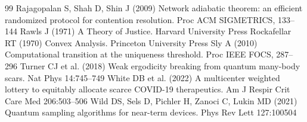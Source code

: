 \documentclass[11pt,a4paper]{article}
\begin{document}
\begin{thebibliography}{99}
 Rajagopalan S, Shah D, Shin J (2009) Network adiabatic theorem: an efficient randomized protocol for contention resolution. Proc ACM SIGMETRICS, 133--144
 Rawls J (1971) A Theory of Justice. Harvard University Press
 Rockafellar RT (1970) Convex Analysis. Princeton University Press
 Sly A (2010) Computational transition at the uniqueness threshold. Proc IEEE FOCS, 287--296
 Turner CJ et al. (2018) Weak ergodicity breaking from quantum many-body scars. Nat Phys 14:745--749
 White DB et al. (2022) A multicenter weighted lottery to equitably allocate scarce COVID-19 therapeutics. Am J Respir Crit Care Med 206:503--506
 Wild DS, Sels D, Pichler H, Zanoci C, Lukin MD (2021) Quantum sampling algorithms for near-term devices. Phys Rev Lett 127:100504
\end{thebibliography}
\end{document}
